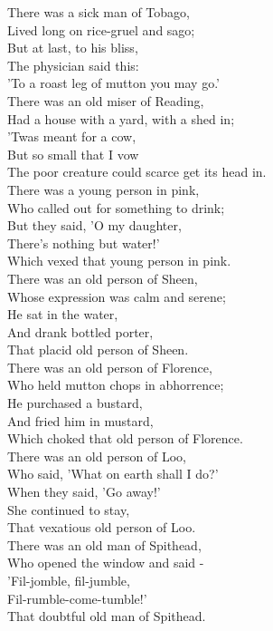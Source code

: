 There was a sick man of Tobago,\\
Lived long on rice-gruel and sago;\\
But at last, to his bliss,\\
The physician said this:\\
'To a roast leg of mutton you may go.'\\

There was an old miser of Reading,\\
Had a house with a yard, with a shed in;\\
'Twas meant for a cow,\\
But so small that I vow\\
The poor creature could scarce get its head in.\\

There was a young person in pink,\\
Who called out for something to drink;\\
But they said, 'O my daughter,\\
There's nothing but water!'\\
Which vexed that young person in pink.\\

There was an old person of Sheen,\\
Whose expression was calm and serene;\\
He sat in the water,\\
And drank bottled porter,\\
That placid old person of Sheen.\\

There was an old person of Florence,\\
Who held mutton chops in abhorrence;\\
He purchased a bustard,\\
And fried him in mustard,\\
Which choked that old person of Florence.\\

There was an old person of Loo,\\
Who said, 'What on earth shall I do?'\\
When they said, 'Go away!'\\
She continued to stay,\\
That vexatious old person of Loo.\\

There was an old man of Spithead,\\
Who opened the window and said - \\
'Fil-jomble, fil-jumble,\\
Fil-rumble-come-tumble!'\\
That doubtful old man of Spithead.\\

